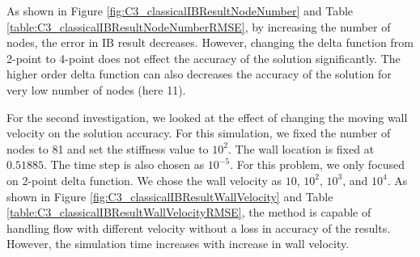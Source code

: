 As shown in Figure \ref{fig:C3_classicalIBResultNodeNumber} and Table \ref{table:C3_classicalIBResultNodeNumberRMSE}, by increasing the number of nodes, the error in IB result decreases. However, changing the delta function from 2-point to 4-point does not effect the accuracy of the solution significantly. The higher order delta function can also decreases the accuracy of the solution for very low number of nodes (here 11). 

For the second investigation, we looked at the effect of changing the moving wall velocity on the solution accuracy. For this simulation, we fixed the number of nodes to 81 and set the stiffness value to $10^2$. The wall location is fixed at $0.51885$. The time step is also chosen as $10^{-5}$. For this problem, we only focused on 2-point delta function. We chose the wall velocity as $10$, $10^2$, $10^3$, and $10^4$. As shown in Figure \ref{fig:C3_classicalIBResultWallVelocity} and Table \ref{table:C3_classicalIBResultWallVelocityRMSE}, the method is capable of handling flow with different velocity without a loss in accuracy of the results. However, the simulation time increases with increase in wall velocity.

